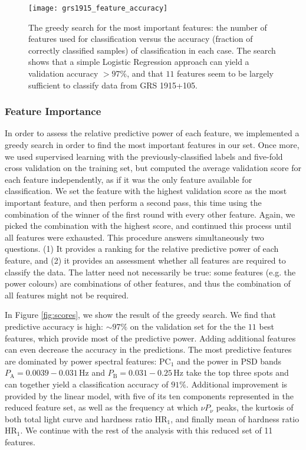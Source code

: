 \documentclass[12pt]{emulateapj}
\begin{document}
\begin{figure}[htbp]
\begin{center}
\texttt{[image: grs1915\_feature\_accuracy]}
\caption{The greedy search for the most important features: the number of features used for classification versus the accuracy (fraction of correctly classified samples) of classification in each case. The search shows that a simple Logistic Regression approach can yield a validation accuracy $>97\%$, and that $11$ features seem to be largely sufficient to classify data from GRS 1915+105.}
\label{fig:asm_total}
\end{center}
\end{figure}

\subsubsection{Feature Importance}

In order to assess the relative predictive power of each feature, we implemented a greedy search in order to find the most important features in our set. 
Once more, we used supervised learning with the previously-classified labels and five-fold cross validation on the training set, but computed the average validation score for each feature independently, as if it was the only feature available for classification. We set the feature with the highest validation score as the most important feature, and then perform a second pass, this time using the combination of the winner of the first round with every other feature. Again, we picked the combination with the highest score, and continued this process until all features were exhausted. This procedure answers simultaneously two questions. (1) It provides a ranking for the relative predictive power of each feature, and (2) it provides an assessment whether all features are required to classify the data. The latter need not necessarily be true: some features (e.g. the power colours) are combinations of other features, and thus the combination of all features might not be required.

In Figure \ref{fig:scores}, we show the result of the greedy search. We find that predictive accuracy is high: $\sim\!\! 97\%$ on the validation set for the the $11$ best features, which provide most of the predictive power. Adding additional features can even decrease the accuracy in the predictions. The most predictive features are dominated by power spectral features: $\mathrm{PC}_1$ and the power in PSD bands  $P_\mathrm{A} = 0.0039-0.031 \,\mathrm{Hz}$ and $P_\mathrm{B} = 0.031-0.25 \,\mathrm{Hz}$ take the top three spots and can together yield a classification accuracy of $91\%$. Additional improvement is provided by the linear model, with five of its ten components represented in the reduced feature set, as well as the frequency at which $\nu P_\nu$ peaks, the kurtosis of both total light curve and hardness ratio $\mathrm{HR}_1$, and finally mean of hardness ratio $\mathrm{HR}_1$. We continue with the rest of the analysis with this reduced set of 11 features.
\end{document}
